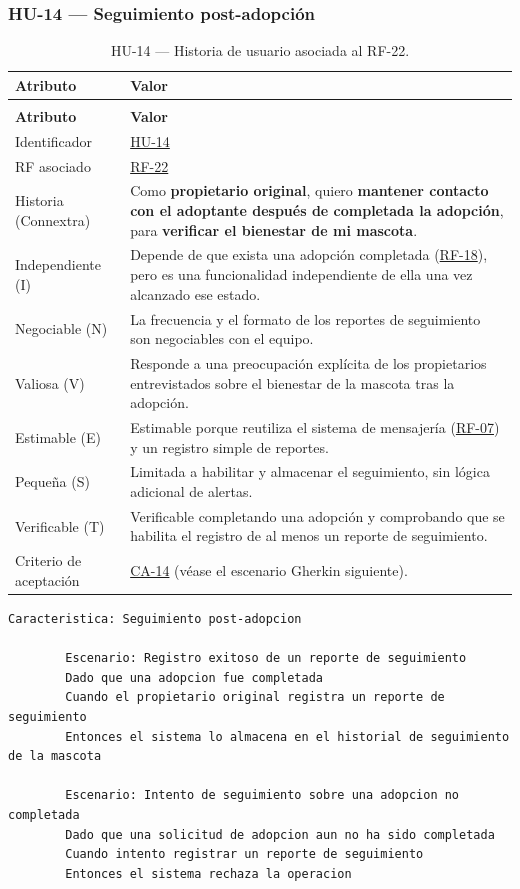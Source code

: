 \documentclass[journal,onecolumn]{IEEEtran}
\makeatletter
\newenvironment{atributos}[2]{%
	\small
	\begin{longtable}{@{}>{\raggedright\arraybackslash}p{4.2cm} >{\raggedright\arraybackslash}p{11.2cm}@{}}
		\caption{#2}\label{tab:#1}\\
		\toprule
		\textbf{Atributo} & \textbf{Valor} \\
		\midrule
		\endfirsthead
		\multicolumn{2}{@{}l}{\small\itshape (continuación)}\\
		\toprule
		\textbf{Atributo} & \textbf{Valor} \\
		\midrule
		\endhead
		\bottomrule
		\endlastfoot
	}{%
	\end{longtable}
	\normalsize
}
\makeatother
\begin{document}
	\subsubsection{HU-14 --- Seguimiento post-adopción}
	
	\begin{atributos}{HU-14}{HU-14 --- Historia de usuario asociada al RF-22.}
		Identificador & \hyperref[tab:HU-14]{HU-14} \\
		RF asociado & \hyperref[tab:RF-22]{RF-22} \\
		Historia (Connextra) & Como \textbf{propietario original}, quiero \textbf{mantener contacto con el adoptante después de completada la adopción}, para \textbf{verificar el bienestar de mi mascota}. \\
		Independiente (I) & Depende de que exista una adopción completada (\hyperref[tab:RF-18]{RF-18}), pero es una funcionalidad independiente de ella una vez alcanzado ese estado. \\
		Negociable (N) & La frecuencia y el formato de los reportes de seguimiento son negociables con el equipo. \\
		Valiosa (V) & Responde a una preocupación explícita de los propietarios entrevistados sobre el bienestar de la mascota tras la adopción. \\
		Estimable (E) & Estimable porque reutiliza el sistema de mensajería (\hyperref[tab:RF-07]{RF-07}) y un registro simple de reportes. \\
		Pequeña (S) & Limitada a habilitar y almacenar el seguimiento, sin lógica adicional de alertas. \\
		Verificable (T) & Verificable completando una adopción y comprobando que se habilita el registro de al menos un reporte de seguimiento. \\
		Criterio de aceptación & \hyperref[lst:ca14]{CA-14} (véase el escenario Gherkin siguiente). \\
	\end{atributos}
	
	\begin{lstlisting}[style=gherkin,caption={CA-14 --- Escenario de aceptación de la historia HU-14.},label={lst:ca14}]
		Caracteristica: Seguimiento post-adopcion
		
		Escenario: Registro exitoso de un reporte de seguimiento
		Dado que una adopcion fue completada
		Cuando el propietario original registra un reporte de seguimiento
		Entonces el sistema lo almacena en el historial de seguimiento de la mascota
		
		Escenario: Intento de seguimiento sobre una adopcion no completada
		Dado que una solicitud de adopcion aun no ha sido completada
		Cuando intento registrar un reporte de seguimiento
		Entonces el sistema rechaza la operacion
	\end{lstlisting}
	
\end{document}
